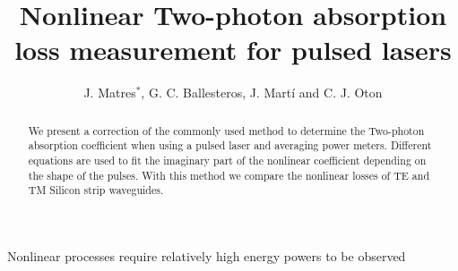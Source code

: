 \documentclass[10pt,letterpaper]{article}
\begin{document}
\title{Nonlinear Two-photon absorption loss measurement for pulsed lasers}

\author{J. Matres$^{*}$, G. C. Ballesteros, J. Mart\'i and C. J. Oton}
\address{Nanophotonics Technology Center, \\ Universidad Polit\'ecnica de Valencia, Camino de Vera s/n, 46022, Valencia, Spain
}




\begin{abstract}
We present a correction of the commonly used method to determine the Two-photon absorption coefficient when using a pulsed laser and averaging power meters. Different equations are used to fit the imaginary part of the nonlinear coefficient depending on the shape of the pulses. With this method we compare the nonlinear losses of TE and TM Silicon strip waveguides.
\end{abstract}





Nonlinear processes require relatively high energy powers to be observed

\end{document}
